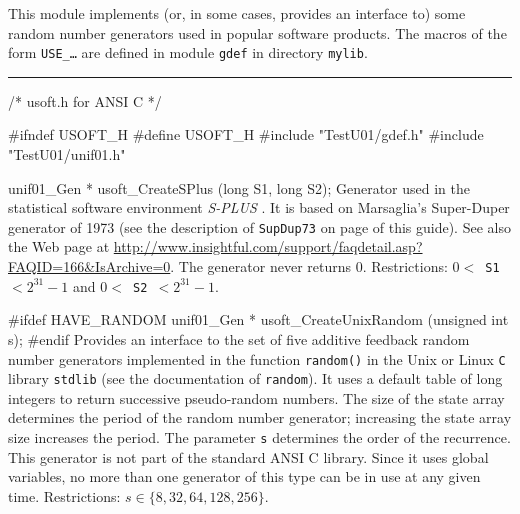
This module implements (or, in some cases, provides an interface to)
some random number generators used in popular software products.
The macros of the form {\tt USE\_\ldots} are defined in module 
{\tt gdef} in directory {\tt mylib}.

\bigskip
\hrule
\code
\hide
/* usoft.h for ANSI C */

#ifndef USOFT_H
#define USOFT_H
\endhide
#include "TestU01/gdef.h"
#include "TestU01/unif01.h"


unif01_Gen * usoft_CreateSPlus (long S1, long S2);
\endcode
  \tab Generator used in the statistical software environment  
%
    {\em S-PLUS\/} \cite{tRIP94a,tSPL00a}. It is based on Marsaglia's Super-Duper
   generator of 1973 (see the description of \texttt{SupDup73} on page
  \pageref{gen:SupDup73} of this guide). See also the Web page at
  \url{http://www.insightful.com/support/faqdetail.asp?FAQID=166&IsArchive=0}.
   The generator never returns 0.
   Restrictions: {\tt $0 <$ S1 $< 2^{31}-1$} and {\tt $0 <$ S2 $< 2^{31}-1$}.
  \endtab
\code


#ifdef HAVE_RANDOM
   unif01_Gen * usoft_CreateUnixRandom (unsigned int s);
#endif
\endcode
  \tab 
  Provides an interface to the set of five additive feedback 
   random number generators implemented in the function {\tt random()} 
   in the Unix or Linux {\tt C} library {\tt stdlib}
%
   (see the documentation of {\tt random}).
   It uses a default table of
      long integers to return successive  pseudo-random  numbers.
      The size  of  the  state  array  determines  the  period  of the
     random number generator; increasing  the  state  array  size
     increases the period.
  The parameter {\tt s} determines the order of the recurrence.
  This generator is not part of the standard ANSI C library.
  Since it uses global variables, no more than one generator
  of this type can be in use at any given time. 
  Restrictions: $s \in \{8, 32, 64, 128, 256\}$. 
 \endtab
\code



